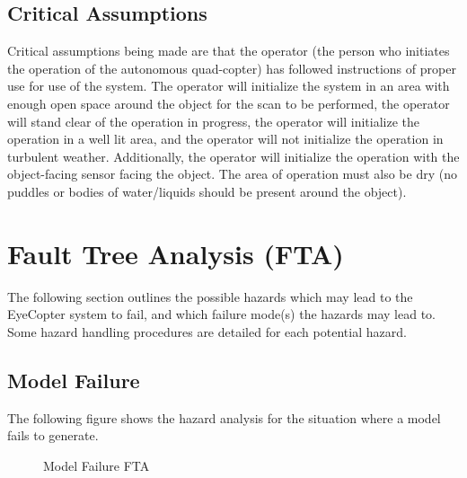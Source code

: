 \documentclass[10pt,letterpaper]{article}
\begin{document}
\subsection{Critical Assumptions}
Critical assumptions being made are that the operator (the person who initiates the operation of the autonomous quad-copter) has followed instructions of proper use for use of the system. The operator will initialize the system in an area with enough open space around the object for the scan to be performed, the operator will stand clear of the operation in progress, the operator will initialize the operation in a well lit area, and the operator will not initialize the operation in turbulent weather.  Additionally, the operator will initialize the operation with the object-facing sensor facing the object. The area of operation must also be dry (no puddles or bodies of water/liquids should be present around the object).


\newpage

\section{Fault Tree Analysis (FTA)}
The following section outlines the possible hazards which may lead to the EyeCopter system to fail, and which failure mode(s) the hazards may lead to. Some hazard handling procedures are detailed for each potential hazard.\\
\subsection{Model Failure}
The following figure shows the hazard analysis for the situation where a model fails to generate.
\begin{figure}[h]
  \caption{Model Failure FTA}
  \label{fig:context_diagram}
\end{figure}
\end{document}
